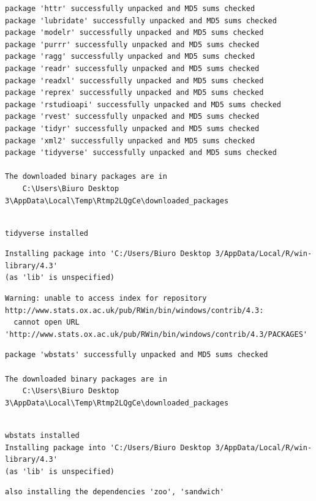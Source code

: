 \documentclass[
  11pt,
]{article}
\begin{document}
\begin{verbatim}
package 'httr' successfully unpacked and MD5 sums checked
package 'lubridate' successfully unpacked and MD5 sums checked
package 'modelr' successfully unpacked and MD5 sums checked
package 'purrr' successfully unpacked and MD5 sums checked
package 'ragg' successfully unpacked and MD5 sums checked
package 'readr' successfully unpacked and MD5 sums checked
package 'readxl' successfully unpacked and MD5 sums checked
package 'reprex' successfully unpacked and MD5 sums checked
package 'rstudioapi' successfully unpacked and MD5 sums checked
package 'rvest' successfully unpacked and MD5 sums checked
package 'tidyr' successfully unpacked and MD5 sums checked
package 'xml2' successfully unpacked and MD5 sums checked
package 'tidyverse' successfully unpacked and MD5 sums checked

The downloaded binary packages are in
    C:\Users\Biuro Desktop 3\AppData\Local\Temp\Rtmp2LQgCe\downloaded_packages
\end{verbatim}

\begin{verbatim}

tidyverse installed
\end{verbatim}

\begin{verbatim}
Installing package into 'C:/Users/Biuro Desktop 3/AppData/Local/R/win-library/4.3'
(as 'lib' is unspecified)
\end{verbatim}

\begin{verbatim}
Warning: unable to access index for repository http://www.stats.ox.ac.uk/pub/RWin/bin/windows/contrib/4.3:
  cannot open URL 'http://www.stats.ox.ac.uk/pub/RWin/bin/windows/contrib/4.3/PACKAGES'
\end{verbatim}

\begin{verbatim}
package 'wbstats' successfully unpacked and MD5 sums checked

The downloaded binary packages are in
    C:\Users\Biuro Desktop 3\AppData\Local\Temp\Rtmp2LQgCe\downloaded_packages
\end{verbatim}

\begin{verbatim}

wbstats installed
Installing package into 'C:/Users/Biuro Desktop 3/AppData/Local/R/win-library/4.3'
(as 'lib' is unspecified)
\end{verbatim}

\begin{verbatim}
also installing the dependencies 'zoo', 'sandwich'
\end{verbatim}
\end{document}
